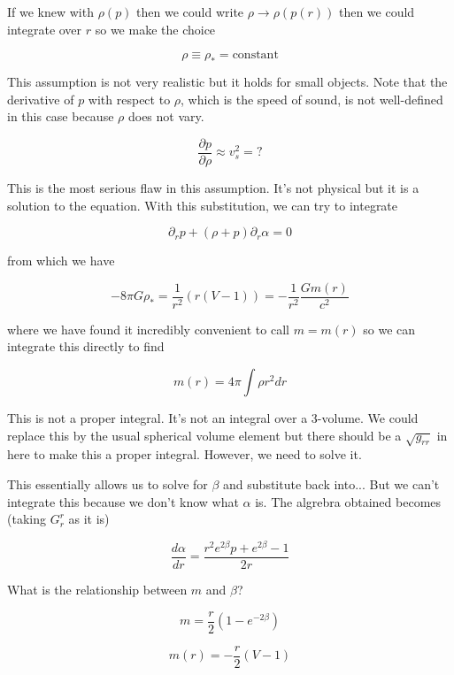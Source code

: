 \documentclass[12pt]{extarticle}
\begin{document}
If we knew with $\rho(p)$ then we could write $\rho \rightarrow \rho(p(r))$ then we could integrate over $r$ so we make the choice

\begin{equation}
\rho \equiv \rho_* = \text{constant}
\end{equation}

This assumption is not very realistic but it holds for small objects. Note that the derivative of $p$ with respect to $\rho$, which is the speed of sound, is not well-defined in this case because $\rho$ does not vary.

\begin{equation}
\frac{\partial p}{\partial \rho} \approx v_s^2 = ?
\end{equation}

This is the most serious flaw in this assumption. It's not physical but it is a solution to the equation. With this substitution, we can try to integrate

\begin{equation}
\partial_r p + (\rho+p)\partial_r \alpha = 0
\end{equation}

from which we have

\begin{equation}
-8\pi G \rho_* = \frac{1}{r^2}(r(V-1)) = -\frac{1}{r^2}\frac{Gm(r)}{c^2}
\end{equation}

where we have found it incredibly convenient to call $m=m(r)$ so we can integrate this directly to find 

$$m(r) = 4\pi \int \rho r^2 dr$$

This is not a proper integral. It's not an integral over a 3-volume. We could replace this by the usual spherical volume element but there should be a $\sqrt{g_{rr}}$ in here to make this a proper integral. However, we need to solve it. 

This essentially allows us to solve for $\beta$ and substitute back into...
But we can't integrate this because we don't know what $\alpha$ is. The algrebra obtained becomes (taking $G^r_r$ as it is)

$$\frac{d\alpha}{dr} = \frac{r^2e^{2\beta}p + e^{2\beta}-1}{2r}$$

What is the relationship between $m$ and $\beta$?

$$m = \frac{r}{2} \left(1-e^{-2\beta}\right)$$

$$m(r) = -\frac{r}{2} (V-1)$$
\end{document}
